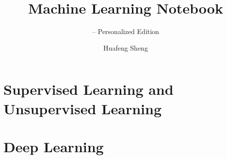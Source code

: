 \documentclass[norunningheads, graybox, envcountchap]{styles02/svmono}
\begin{document}
	
	\author{Huafeng Sheng}
	\title{Machine Learning Notebook}
	\subtitle{-- Personalized Edition}
	\maketitle
	
	\frontmatter%
	
%	
	
	
	\tableofcontents
	
	
	
	\mainmatter%
	\part{Supervised Learning and Unsupervised Learning}
	
	
	
	
	
	
	
	
	
	
	
	
	
	
	
	
	
	
	
	
	
	
	
	
	
	
	
	\part{Deep Learning}
	
	
	
	\backmatter%
	\appendix
	
	\printindex
	
	
\end{document}
